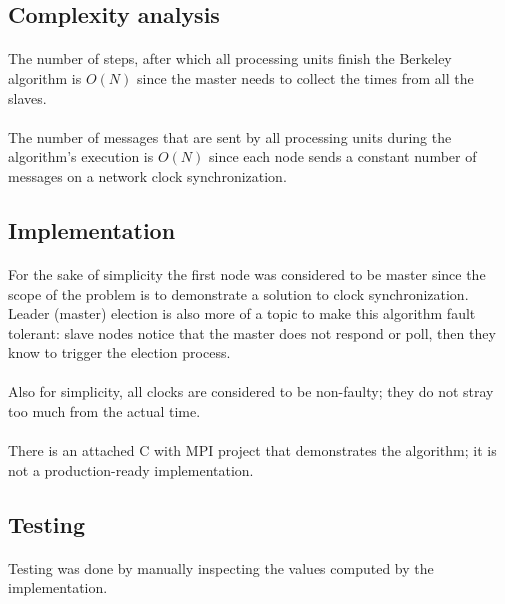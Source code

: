 \documentclass[12pt]{article}
\begin{document}
\subsection{Complexity analysis}
\paragraph{}
The number of steps, after which all processing units finish the Berkeley algorithm is $O(N)$ since the master needs to collect the times from all the slaves.

\paragraph{}
The number of messages that are sent by all processing units during the algorithm's execution is $O(N)$ since each node sends a constant number of messages on a network clock synchronization.


\subsection{Implementation}
\paragraph{}
For the sake of simplicity the first node was considered to be master since the scope of the problem is to demonstrate a solution to clock synchronization. Leader (master) election is also more of a topic to make this algorithm fault tolerant: slave nodes notice that the master does not respond or poll, then they know to trigger the election process.

\paragraph{}
Also for simplicity, all clocks are considered to be non-faulty; they do not stray too much from the actual time.

\paragraph{}
There is an attached C with MPI project that demonstrates the algorithm; it is not a production-ready implementation.

\subsection{Testing}
\paragraph{}
Testing was done by manually inspecting the values computed by the implementation.
\end{document}
